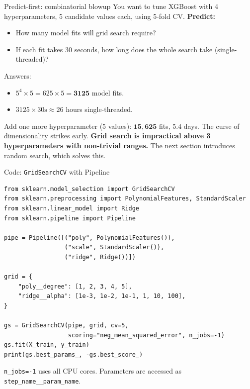 \documentclass[aspectratio=169]{beamer}
\begin{document}
\begin{frame}{Predict-first: combinatorial blowup}
  You want to tune XGBoost with 4 hyperparameters, 5 candidate values each, using 5-fold CV.
  \vfill
  \pause
  \textbf{Predict:}
  \begin{itemize}
    \item How many model fits will grid search require?
    \item If each fit takes 30 seconds, how long does the whole search take (single-threaded)?
  \end{itemize}
  \vfill
  \pause
  Answers:
  \begin{itemize}
    \item $5^4 \times 5 = 625 \times 5 = \mathbf{3125}$ model fits.
    \item $3125 \times 30\text{s} \approx 26$ hours single-threaded.
  \end{itemize}
  \vfill
  Add one more hyperparameter (5 values): $\mathbf{15{,}625}$ fits, $\mathbf{5.4}$ days. The curse of dimensionality strikes early.
  \vfill
  \textbf{Grid search is impractical above 3 hyperparameters with non-trivial ranges.} The next section introduces random search, which solves this.
\end{frame}

\begin{frame}[fragile]{Code: \texttt{GridSearchCV} with Pipeline}
\begin{lstlisting}
from sklearn.model_selection import GridSearchCV
from sklearn.preprocessing import PolynomialFeatures, StandardScaler
from sklearn.linear_model import Ridge
from sklearn.pipeline import Pipeline

pipe = Pipeline([("poly", PolynomialFeatures()),
                 ("scale", StandardScaler()),
                 ("ridge", Ridge())])

grid = {
    "poly__degree": [1, 2, 3, 4, 5],
    "ridge__alpha": [1e-3, 1e-2, 1e-1, 1, 10, 100],
}

gs = GridSearchCV(pipe, grid, cv=5,
                  scoring="neg_mean_squared_error", n_jobs=-1)
gs.fit(X_train, y_train)
print(gs.best_params_, -gs.best_score_)
\end{lstlisting}
  \vfill
  \footnotesize \texttt{n\_jobs=-1} uses all CPU cores. Parameters are accessed as \texttt{step\_name\_\_param\_name}.
\end{frame}
\end{document}
